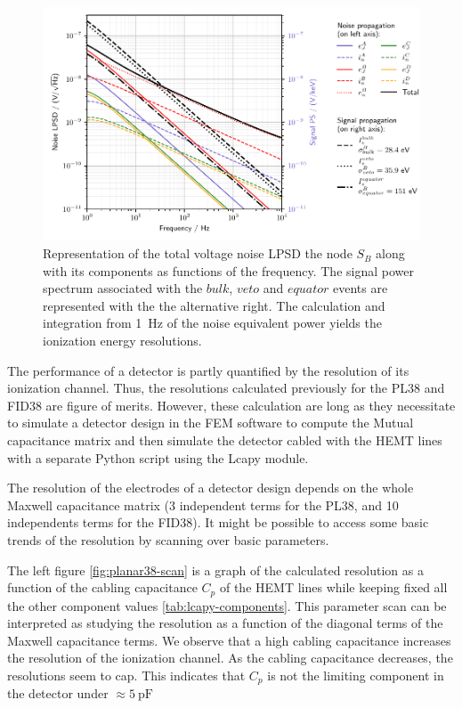 \begin{figure}
\centering
\includegraphics[scale=1]{Figures/Electrodes/fid38_noise_propagation.pdf}
\caption{Representation of the total voltage noise LPSD the node $S_B$ along with its components as functions of the frequency. The signal power spectrum associated with the $bulk$, $veto$ and $equator$ events are represented with the the alternative right. The calculation and integration from \SI{1}{\Hz} of the noise equivalent power yields the ionization energy resolutions.
}
\label{fig:fid38-propagation}
\end{figure}

The performance of a detector is partly quantified by the resolution of its ionization channel. Thus, the resolutions calculated previously for the PL38 and FID38 are figure of merits. However, these calculation are long as they necessitate to simulate a detector design in the FEM software to compute the Mutual capacitance matrix and then simulate the detector cabled with the HEMT lines with a separate Python script using the Lcapy module.

The resolution of the electrodes of a detector design depends on the whole Maxwell capacitance matrix (3 independent terms for the PL38, and 10 independents terms for the FID38). It might be possible to access some basic trends of the resolution by scanning over basic parameters.

The left figure \ref{fig:planar38-scan} is a graph of the calculated resolution as a function of the cabling capacitance $C_p$ of the HEMT lines while keeping fixed all the other component values \ref{tab:lcapy-components}. This parameter scan can be interpreted as studying the resolution as a function of the diagonal terms of the Maxwell capacitance terms. We observe that a high cabling capacitance increases the resolution of the ionization channel. As the cabling capacitance decreases, the resolutions seem to cap. This indicates that $C_p$ is not the limiting component in the detector under $\approx \SI{5}{\pico\farad}$

